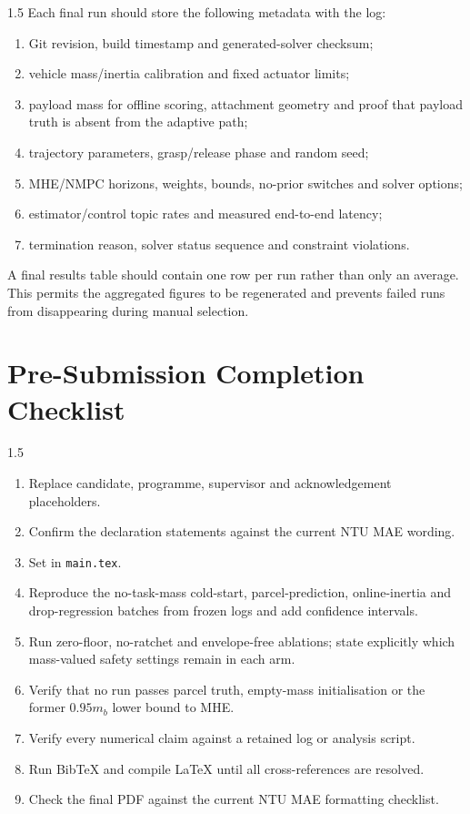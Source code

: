 \begin{appendices}
\begin{spacing}{1.5}
Each final run should store the following metadata with the log:
\begin{enumerate}
    \item Git revision, build timestamp and generated-solver checksum;
    \item vehicle mass/inertia calibration and fixed actuator limits;
    \item payload mass for offline scoring, attachment geometry and proof that payload truth is absent from the adaptive path;
    \item trajectory parameters, grasp/release phase and random seed;
    \item MHE/NMPC horizons, weights, bounds, no-prior switches and solver options;
    \item estimator/control topic rates and measured end-to-end latency;
    \item termination reason, solver status sequence and constraint violations.
\end{enumerate}

A final results table should contain one row per run rather than only an average. This permits the aggregated figures to be regenerated and prevents failed runs from disappearing during manual selection.
\end{spacing}

\chapter{Pre-Submission Completion Checklist}

\begin{spacing}{1.5}
\begin{enumerate}
    \item Replace candidate, programme, supervisor and acknowledgement placeholders.
    \item Confirm the declaration statements against the current NTU MAE wording.
    \item Set \texttt{\string\showdraftnotesfalse} in \texttt{main.tex}.
    \item Reproduce the no-task-mass cold-start, parcel-prediction, online-inertia and drop-regression batches from frozen logs and add confidence intervals.
    \item Run zero-floor, no-ratchet and envelope-free ablations; state explicitly which mass-valued safety settings remain in each arm.
    \item Verify that no run passes parcel truth, empty-mass initialisation or the former $0.95m_b$ lower bound to MHE.
    \item Verify every numerical claim against a retained log or analysis script.
    \item Run BibTeX and compile LaTeX until all cross-references are resolved.
    \item Check the final PDF against the current NTU MAE formatting checklist.
\end{enumerate}
\end{spacing}

\end{appendices}
